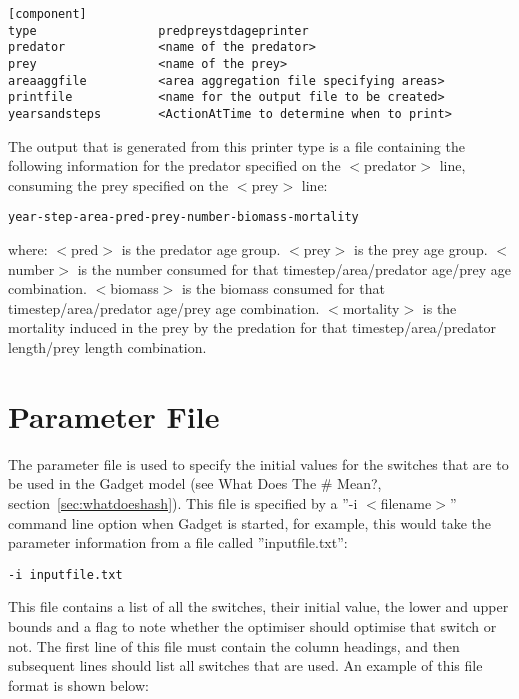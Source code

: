 \documentclass [a4paper, 10pt]{book}
\begin{document}
{\small\begin{verbatim}
[component]
type                 predpreystdageprinter
predator             <name of the predator>
prey                 <name of the prey>
areaaggfile          <area aggregation file specifying areas>
printfile            <name for the output file to be created>
yearsandsteps        <ActionAtTime to determine when to print>
\end{verbatim}}

The output that is generated from this printer type is a file containing the following information for the predator specified on the $<$predator$>$ line, consuming the prey specified on the $<$prey$>$ line:

{\small\begin{verbatim}
year-step-area-pred-prey-number-biomass-mortality
\end{verbatim}}

where:\newline
$<$pred$>$ is the predator age group.\newline
$<$prey$>$ is the prey age group.\newline
$<$number$>$ is the number consumed for that timestep/area/predator age/prey age combination.\newline
$<$biomass$>$ is the biomass consumed for that timestep/area/predator age/prey age combination.\newline
$<$mortality$>$ is the mortality induced in the prey by the predation for that timestep/area/predator length/prey length combination.

\chapter{Parameter File}\label{chap:param}
The parameter file is used to specify the initial values for the switches that are to be used in the Gadget model (see What Does The \# Mean?, section~\ref{sec:whatdoeshash}).  This file is specified by a ''-i $<$filename$>$'' command line option when Gadget is started, for example, this would take the parameter information from a file called ''inputfile.txt'':

{\small\begin{verbatim}
-i inputfile.txt
\end{verbatim}}

This file contains a list of all the switches, their initial value, the lower and upper bounds and a flag to note whether the optimiser should optimise that switch or not.  The first line of this file must contain the column headings, and then subsequent lines should list all switches that are used.  An example of this file format is shown below:
\end{document}
